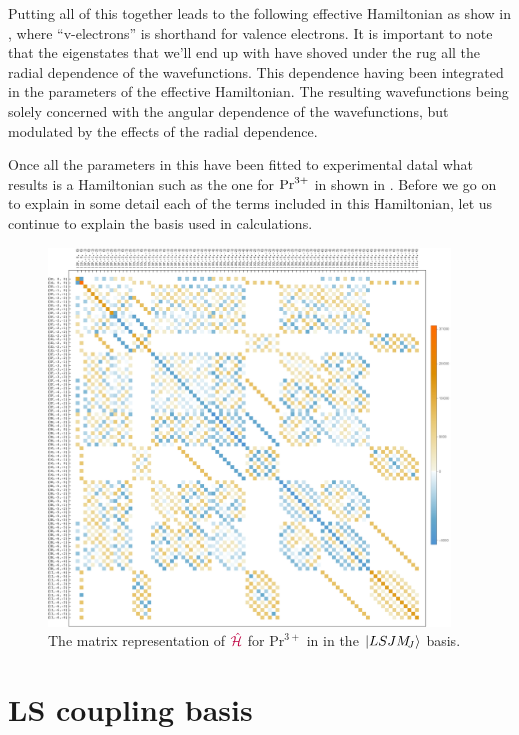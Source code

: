 \documentclass[11pt, twoside,openright]{article}
\begin{document}
Putting all of this together leads to the following effective Hamiltonian as show in , where ``v-electrons'' is shorthand for valence electrons. It is important to note that the eigenstates that we'll end up with have shoved under the rug all the radial dependence of the wavefunctions. This dependence having been integrated in the parameters of the effective Hamiltonian. The resulting wavefunctions being solely concerned with the angular dependence of the wavefunctions, but modulated by the effects of the radial dependence.



Once all the parameters in this \hamilton have been fitted to experimental datal what results is a Hamiltonian such as the one for $\textrm{Pr}^{3+}$ in \LaFthree shown in . Before we go on to explain in some detail each of the terms included in this Hamiltonian, let us continue to explain the basis used in calculations.

\begin{figure}[h!]
	\begin{center}
		\includegraphics[width=0.95\textwidth]{./figures/Prplot.pdf}
	\end{center}
	\caption{The matrix representation of $\textcolor{purple}{\hat{\mathcal{H}}}$ for $\text{Pr}^{3+}$ in \LaFthree in the $|LSJM_{\!{J}}\rangle$ basis.}
	\label{fig:Pr_in_LaF3} 
\end{figure}

\section{LS coupling basis}\label{section:ls-basis}
\end{document}
